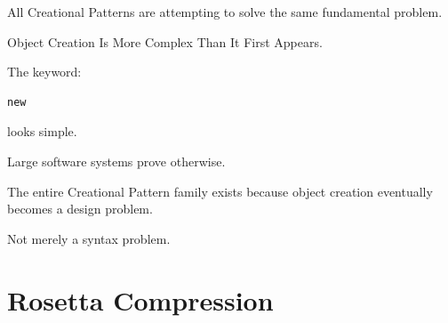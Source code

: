 \documentclass[11pt,a4paper]{book}
\begin{document}
All Creational Patterns are
attempting to solve the same
fundamental problem.


Object Creation Is More Complex
Than It First Appears.


The keyword:

\begin{verbatim}
new
\end{verbatim}

looks simple.


Large software systems prove
otherwise.


\begin{idea}

The entire Creational Pattern
family exists because object
creation eventually becomes
a design problem.


Not merely a syntax problem.

\end{idea}

\section{Rosetta Compression}
\end{document}

